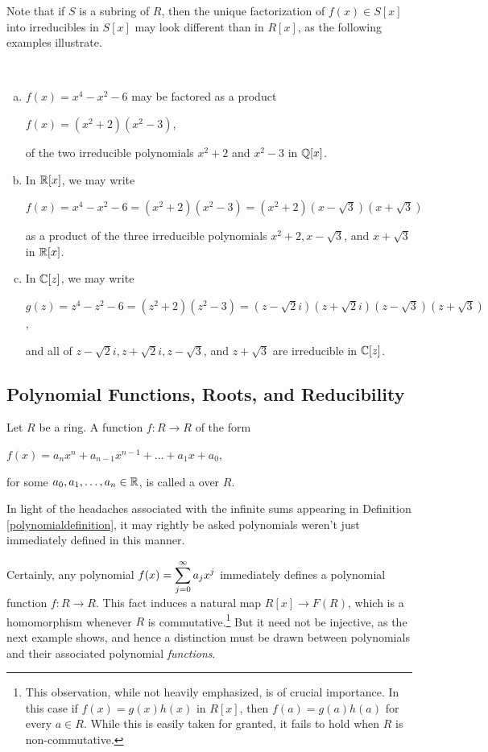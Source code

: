 \documentclass[11pt,fleqn,dvipsnames,usenames]{article}
\newcommand{\p}{\noindent}
\begin{document}
\vsp

%
\p Note that if $S$ is a subring of $R$, then the unique factorization of $f(x)\in S[x]$ into irreducibles in $S[x]$ may look different than in $R[x]$, as the following examples illustrate.
\vsp

\begin{examples}~
\begin{enumerate}[(a)]
\item $f(x) = x^4 - x^2 - 6$ may be factored as a product
\begin{center}
$f(x) = (x^2 + 2)(x^2 - 3)$,
\end{center}
of the two irreducible polynomials $x^2 + 2$ and $x^2 - 3$ in $\mathbb{Q}[x]$.
\item In $\mathbb{R}[x]$, we may write
\begin{center}
$f(x) = x^4 - x^2 - 6 = (x^2 + 2)(x^2 - 3) = (x^2 + 2)(x - \sqrt{3})(x + \sqrt{3})$
\end{center}
as a product of the three irreducible polynomials $x^2 + 2, x - \sqrt{3}$, and $x+\sqrt{3}$ in $\mathbb{R}[x]$.
\item In $\mathbb{C}[z]$, we may write
\begin{center}
$g(z) = z^4 - z^2 - 6 = (z^2 + 2)(z^2 - 3) = (z-\sqrt{2}i)(z + \sqrt{2}i)(z - \sqrt{3})(z + \sqrt{3})$,
\end{center}
and all of $z-\sqrt{2}i, z + \sqrt{2}i, z - \sqrt{3}$, and $z + \sqrt{3}$ are irreducible in $\mathbb{C}[z]$.
\end{enumerate}
\end{examples}
\newpage

%
\subsection{Polynomial Functions, Roots, and Reducibility}
\begin{definition}
Let $R$ be a ring.  A function $f:R\to R$ of the form
\begin{center}
$f(x) = a_{n}x^n + a_{n-1}x^{n-1} + \ldots + a_{1}x + a_{0}$,
\end{center}
for some $a_{0},a_{1},\ldots, a_{n}\in\mathbb{R}$, is called a  over $R$.
\end{definition}
\p In light of the headaches associated with the infinite sums appearing in Definition \ref{polynomialdefinition}, it may rightly be asked polynomials weren't just immediately defined in this manner.
\vsp

\p Certainly, any polynomial $f(x) = \displaystyle\sum\limits_{j=0}^{\infty}a_{j}x^{j}$ immediately defines a polynomial function $f:R\to R$.  This fact induces a natural map $R[x]\to F(R)$, which is a homomorphism whenever $R$ is commutative.\footnote{This observation, while not heavily emphasized, is of crucial importance.  In this case if $f(x) = g(x)h(x)$ in $R[x]$, then $f(a) = g(a)h(a)$ for every $a\in R$.  While this is easily taken for granted, it fails to hold when $R$ is non-commutative.}  But it need not be injective, as the next example shows, and hence a distinction must be drawn between polynomials and their associated polynomial \emph{functions}.
\vsp
\end{document}
